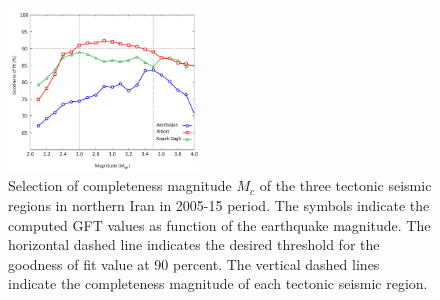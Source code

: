 \begin{figure}%
	\centering
	\includegraphics[width=0.45\textwidth]{figures/pdf/Figure05.pdf} 
	\caption{Selection of completeness magnitude $M_c$ of the three tectonic seismic regions in northern Iran in 2005-15 period. The symbols indicate the computed GFT values as function of the earthquake magnitude. The horizontal dashed line indicates the desired threshold for the goodness of fit value at 90 percent. The vertical dashed lines indicate the completeness magnitude of each tectonic seismic region.}
	\label{fig:completeness}
\end{figure} 




